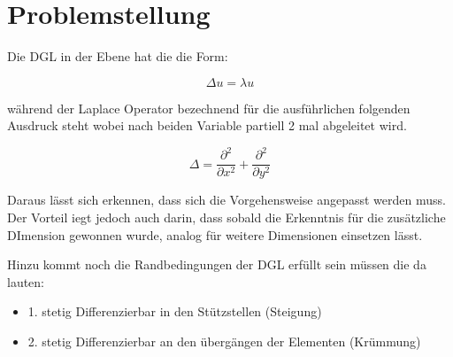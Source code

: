 %
%
%
\section{Problemstellung
\label{fem:section:problemstellung}}

Die DGL in der Ebene hat die die Form:

\begin{equation}
	\Delta u = \lambda u
	\label{fem:DGL2D}
\end{equation} 

während der Laplace Operator bezechnend für die ausführlichen folgenden Ausdruck steht wobei nach beiden Variable partiell 2 mal abgeleitet wird.

\begin{equation}
	\Delta = \frac{\partial ^2}{\partial x^2} + \frac{\partial ^2}{\partial y^2}
\end{equation} 

Daraus lässt sich erkennen, dass sich die Vorgehensweise angepasst werden muss. Der Vorteil iegt jedoch auch darin, dass sobald die Erkenntnis für die zusätzliche DImension gewonnen wurde, analog für weitere Dimensionen einsetzen lässt.

Hinzu kommt noch die Randbedingungen der DGL erfüllt sein müssen die da lauten:

\begin{itemize}
	\item 1. stetig Differenzierbar in den Stützstellen (Steigung)
	\item 2. stetig Differenzierbar an den übergängen der Elementen (Krümmung)
\end{itemize}








